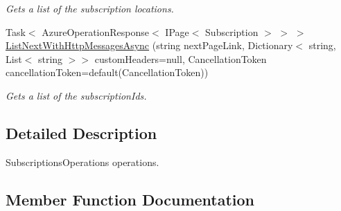 \begin{DoxyCompactItemize}
\begin{DoxyCompactList}\small\item\em Gets a list of the subscription locations. \end{DoxyCompactList}\item 
Task$<$ Azure\+Operation\+Response$<$ I\+Page$<$ Subscription $>$ $>$ $>$ \hyperlink{interface_microsoft_1_1_azure_1_1_management_1_1_resources_1_1_i_subscriptions_operations_aa7c289b12146484dbb129e5533cd6c36}{List\+Next\+With\+Http\+Messages\+Async} (string next\+Page\+Link, Dictionary$<$ string, List$<$ string $>$$>$ custom\+Headers=null, Cancellation\+Token cancellation\+Token=default(Cancellation\+Token))
\begin{DoxyCompactList}\small\item\em Gets a list of the subscription\+Ids. \end{DoxyCompactList}\end{DoxyCompactItemize}


\subsection{Detailed Description}
Subscriptions\+Operations operations. 



\subsection{Member Function Documentation}
